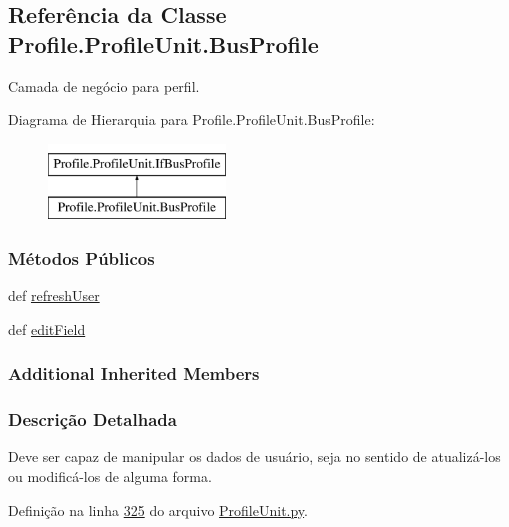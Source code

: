 \hypertarget{classProfile_1_1ProfileUnit_1_1BusProfile}{\subsection{Referência da Classe Profile.\-Profile\-Unit.\-Bus\-Profile}
\label{classProfile_1_1ProfileUnit_1_1BusProfile}
}


Camada de negócio para perfil.  


Diagrama de Hierarquia para Profile.\-Profile\-Unit.\-Bus\-Profile\-:\begin{figure}[H]
\begin{center}
\leavevmode
\includegraphics[height=2.000000cm]{df/da4/classProfile_1_1ProfileUnit_1_1BusProfile}
\end{center}
\end{figure}
\subsubsection*{Métodos Públicos}
\begin{DoxyCompactItemize}
\item 
def \hyperlink{classProfile_1_1ProfileUnit_1_1BusProfile_a87c3d0374f709af7904656938eafd6d3}{refresh\-User}
\item 
def \hyperlink{classProfile_1_1ProfileUnit_1_1BusProfile_a5c116d007081ffefcc1c45cd34c88e10}{edit\-Field}
\end{DoxyCompactItemize}
\subsubsection*{Additional Inherited Members}


\subsubsection{Descrição Detalhada}
Deve ser capaz de manipular os dados de usuário, seja no sentido de atualizá-\/los ou modificá-\/los de alguma forma. 

Definição na linha \hyperlink{ProfileUnit_8py_source_l00325}{325} do arquivo \hyperlink{ProfileUnit_8py_source}{Profile\-Unit.\-py}.



